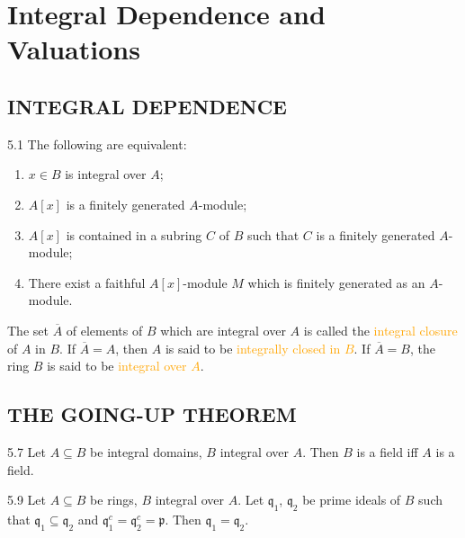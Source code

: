 \chapter{Integral Dependence and Valuations}

\section*{INTEGRAL DEPENDENCE}

\begin{proposition}{5.1}
	The following are equivalent:
	\begin{enumerate}[label=\textup{(\roman*)}]
		\item $x\in B$ is integral over $A$;
		\item $A[x]$ is a finitely generated $A$-module;
		\item $A[x]$ is contained in a subring $C$ of $B$ such that $C$ is a finitely generated $A$-module;
		\item There exist a faithful $A[x]$-module $M$ which is finitely generated as an $A$-module.
	\end{enumerate}
\end{proposition}

\begin{definition}
	The set $\overline{A}$ of elements of $B$ which are integral over $A$ is called the \textcolor{orange}{integral closure} of $A$ in $B$. If $\overline{A}=A$, then $A$ is said to be \textcolor{orange}{integrally closed in $B$}. If $\overline{A}=B$, the ring $B$ is said to be \textcolor{orange}{integral over $A$}.
\end{definition}

\section*{THE GOING-UP THEOREM}
\begin{proposition}{5.7}
	Let $A\subseteq B$ be integral domains, $B$ integral over $A$. Then $B$ is a field iff $A$ is a field.
\end{proposition}

\begin{corollary}{5.9}
	Let $A\subseteq B$ be rings, $B$ integral over $A$. Let $\mathfrak{q}_1$, $\mathfrak{q}_2$ be prime ideals of $B$ such that $\mathfrak{q}_1\subseteq\mathfrak{q}_2$ and $\mathfrak{q}_1^c=\mathfrak{q}_2^c=\mathfrak{p}$. Then $\mathfrak{q}_1=\mathfrak{q}_2$.
\end{corollary}

